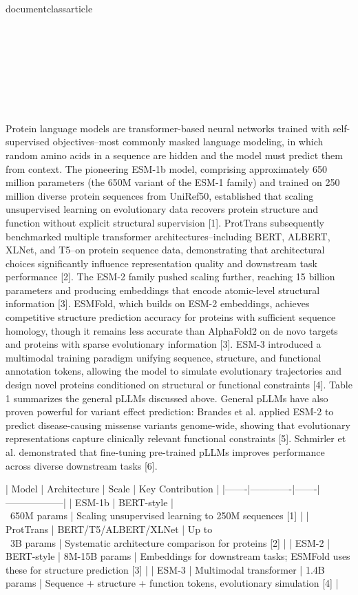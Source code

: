 \\documentclass{article}
\begin{document}
\section{}

\subsection{}

Protein language models are transformer-based neural networks trained with self-supervised objectives--most commonly masked language modeling, in which random amino acids in a sequence are hidden and the model must predict them from context. The pioneering ESM-1b model, comprising approximately 650 million parameters (the 650M variant of the ESM-1 family) and trained on 250 million diverse protein sequences from UniRef50, established that scaling unsupervised learning on evolutionary data recovers protein structure and function without explicit structural supervision [1]. ProtTrans subsequently benchmarked multiple transformer architectures--including BERT, ALBERT, XLNet, and T5--on protein sequence data, demonstrating that architectural choices significantly influence representation quality and downstream task performance [2]. The ESM-2 family pushed scaling further, reaching 15 billion parameters and producing embeddings that encode atomic-level structural information [3]. ESMFold, which builds on ESM-2 embeddings, achieves competitive structure prediction accuracy for proteins with sufficient sequence homology, though it remains less accurate than AlphaFold2 on de novo targets and proteins with sparse evolutionary information [3]. ESM-3 introduced a multimodal training paradigm unifying sequence, structure, and functional annotation tokens, allowing the model to simulate evolutionary trajectories and design novel proteins conditioned on structural or functional constraints [4]. Table 1 summarizes the general pLLMs discussed above. General pLLMs have also proven powerful for variant effect prediction: Brandes et al. applied ESM-2 to predict disease-causing missense variants genome-wide, showing that evolutionary representations capture clinically relevant functional constraints [5]. Schmirler et al. demonstrated that fine-tuning pre-trained pLLMs improves performance across diverse downstream tasks [6].

| Model | Architecture | Scale | Key Contribution |
|-------|-------------|-------|------------------|
| ESM-1b | BERT-style | \\~650M params | Scaling unsupervised learning to 250M sequences [1] |
| ProtTrans | BERT/T5/ALBERT/XLNet | Up to \\~3B params | Systematic architecture comparison for proteins [2] |
| ESM-2 | BERT-style | 8M-15B params | Embeddings for downstream tasks; ESMFold uses these for structure prediction [3] |
| ESM-3 | Multimodal transformer | 1.4B params | Sequence + structure + function tokens, evolutionary simulation [4] |
\end{document}
